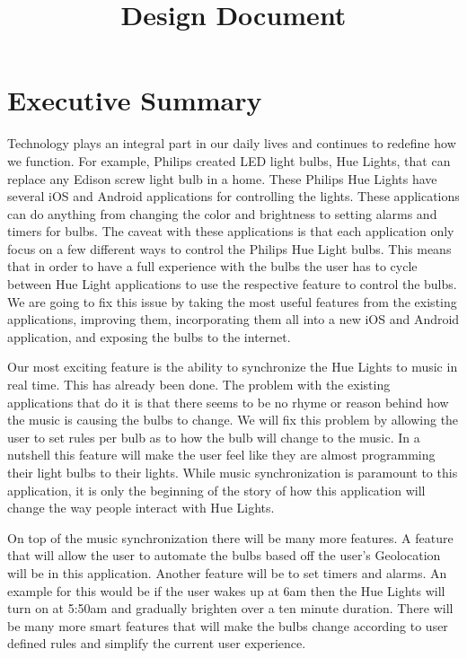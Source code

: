 \documentclass[12pt]{article}
\begin{document}
\title{Design Document}
\setlength{\voffset}{0cm}
\setlength{\hoffset}{0cm}

\setlength{\voffset}{-2.54cm}
\setlength{\hoffset}{-2.54cm}
\tableofcontents
\clearpage
{}


\renewcommand{\thefigure}{\arabic{section}.\arabic{figure}}

\section{Executive Summary}
Technology plays an integral part in our daily lives and continues to redefine how we function.  For example, Philips created LED light bulbs, Hue Lights, that can replace any Edison screw light bulb in a home.  These Philips Hue Lights have several iOS and Android applications for controlling the lights. These applications can do anything from changing the color and brightness to setting alarms and timers for bulbs. The caveat with these applications is that each application only focus on a few different ways to control the Philips Hue Light bulbs.  This means that in order to have a full experience with the bulbs the user has to cycle between Hue Light applications to use the respective feature to control the bulbs. We are going to fix this issue by taking the most useful features from the existing applications, improving them, incorporating them all into a new iOS and Android application, and exposing the bulbs to the internet. 
 
Our most exciting feature is the ability to synchronize the Hue Lights to music in real time.  This has already been done. The problem with the existing applications that do it is that there seems to be no rhyme or reason behind how the music is causing the bulbs to change.  We will fix this problem by allowing the user to set rules per bulb as to how the bulb will change to the music.  In a nutshell this feature will make the user feel like they are almost programming their light bulbs to their lights. While music synchronization is paramount to this application, it is only the beginning of the story of how this application will change the way people interact with Hue Lights.

On top of the music synchronization there will be many more features.  A feature that will allow the user to automate the bulbs based off the user's Geolocation will be in this application.  Another feature will be to set timers and alarms.  An example for this would be if the user wakes up at 6am then the Hue Lights will turn on at 5:50am and gradually brighten over a ten minute duration.  There will be many more smart features that will make the bulbs change according to user defined rules and simplify the current user experience. 
\end{document}
